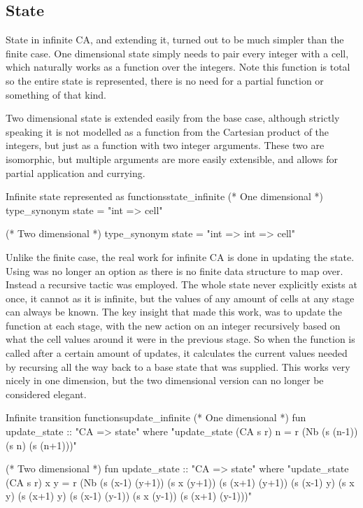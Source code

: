 \subsection{State}

State in infinite CA,
and extending it,
turned out to be much simpler than the finite case.
One dimensional state simply needs to pair every integer with a cell,
which naturally works as a function over the integers.
Note this function is total so the entire state is represented,
there is no need for a partial function or something of that kind.

Two dimensional state is extended easily from the base case,
although strictly speaking it is not modelled as a function from the Cartesian product of the integers,
but just as a function with two integer arguments.
These two are isomorphic,
but multiple arguments are more easily extensible,
and allows for partial application and currying.

\begin{myminted}{Infinite state represented as functions}{state_infinite}
    (* One dimensional *)
    type_synonym state = "int => cell"

    (* Two dimensional *)
    type_synonym state = "int => int => cell"
\end{myminted}

Unlike the finite case,
the real work for infinite CA is done in updating the state.
Using  was no longer an option as there is no finite data structure to map over.
Instead a recursive tactic was employed.
The whole state never explicitly exists at once,
it cannot as it is infinite,
but the values of any amount of cells at any stage can always be known.
The key insight that made this work,
was to update the  function at each stage,
with the new action on an integer recursively based on what the cell values around it were in the previous stage.
So when the function is called after a certain amount of updates,
it calculates the current values needed by recursing all the way back to a base state that was supplied.
This works very nicely in one dimension,
but the two dimensional version can no longer be considered elegant.

\begin{myminted}{Infinite transition functions}{update_infinite}
    (* One dimensional *)
    fun update_state :: "CA => state" where
    "update_state (CA s r) n = r (Nb (s (n-1)) (s n) (s (n+1)))"

    (* Two dimensional *)
    fun update_state :: "CA => state" where
    "update_state (CA s r) x y =
        r (Nb (s (x-1) (y+1)) (s x (y+1)) (s (x+1) (y+1))
              (s (x-1)  y)    (s x  y)    (s (x+1)  y)
              (s (x-1) (y-1)) (s x (y-1)) (s (x+1) (y-1)))"
\end{myminted}

